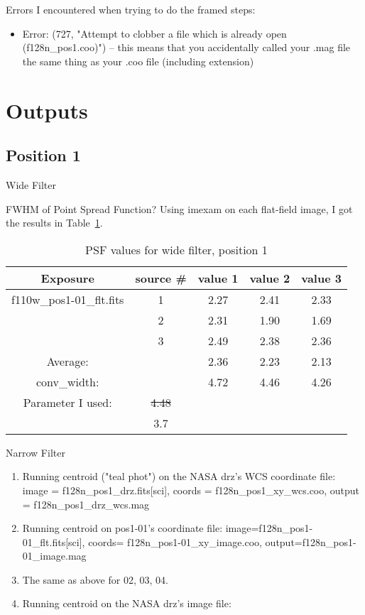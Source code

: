 \documentclass[11pt,obeyspaces]{article} %
\begin{document}
Errors I encountered when trying to do the framed steps: 
\begin{itemize}
\item Error: (727, "Attempt to clobber a file which is already open (f128n\_pos1.coo)") -- this means that you accidentally called your .mag file the same thing as your .coo file (including extension) 
\end{itemize}

\section{Outputs} 
\subsection{Position 1}

\centerline{\sc Wide Filter} 
FWHM of Point Spread Function? Using imexam on each flat-field image, I got the results in Table~\ref{table:wimexam1}. 

\begin{table}
\caption{PSF values for wide filter, position 1}
\begin{center}
\begin{tabular}{|c|c|c|c|c|} \hline
Exposure & source \# & value 1 & value 2 & value 3 \\ \hline
f110w\_pos1-01\_flt.fits & 1 & 2.27 & 2.41 & 2.33  \\
 & 2 & 2.31 & 1.90 & 1.69 \\
 & 3 & 2.49 & 2.38 & 2.36 \\ \hline
Average: & & 2.36 & 2.23 & 2.13 \\ 
conv\_width: & & 4.72 & 4.46 & 4.26 \\
Parameter I used: & \sout{4.48} & & & \\ 
& 3.7 & & & \\ \hline 
\end{tabular}
\end{center}
\label{table:wimexam1}
\end{table}

\bigskip

\centerline{\sc Narrow Filter}


\begin{enumerate}
\item Running centroid ("teal phot") on the NASA drz's WCS coordinate file: image = f128n\_pos1\_drz.fits[sci], coords = f128n\_pos1\_xy\_wcs.coo, output = f128n\_pos1\_drz\_wcs.mag
\item Running centroid on pos1-01's coordinate file: image=f128n\_pos1-01\_flt.fits[sci], coords= f128n\_pos1-01\_xy\_image.coo, output=f128n\_pos1-01\_image.mag
\item The same as above for 02, 03, 04. 
\item Running centroid on the NASA drz's image file: 
\end{enumerate}
\end{document}
